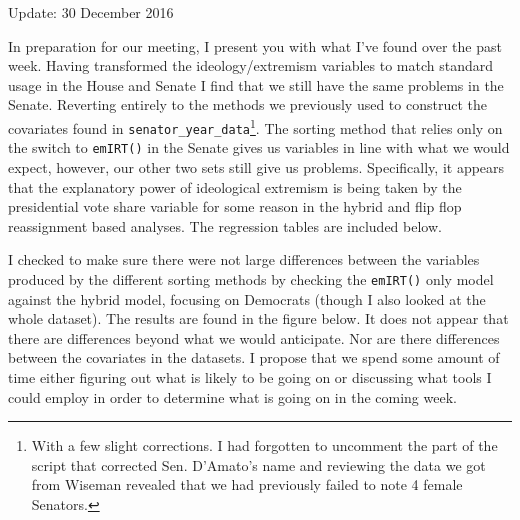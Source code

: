 \documentclass[12pt]{article}
\begin{document}
	
	\begin{center}
		Update: 30 December 2016
	\end{center}

In preparation for our meeting, I present you with what I've found over the past week. Having transformed the ideology/extremism variables to match standard usage in the House and Senate I find that we still have the same problems in the Senate. Reverting entirely to the methods we previously used to construct the covariates found in \verb|senator_year_data|\footnote{With a few slight corrections. I had forgotten to uncomment the part of the script that corrected Sen. D'Amato's name and reviewing the data we got from Wiseman revealed that we had previously failed to note 4 female Senators.}. The sorting method that relies only on the switch to \verb|emIRT()| in the Senate gives us variables in line with what we would expect, however, our other two sets still give us problems. Specifically, it appears that the explanatory power of ideological extremism is being taken by the presidential vote share variable for some reason in the hybrid and flip flop reassignment based analyses. The regression tables are included below.

I checked to make sure there were not large differences between the variables produced by the different sorting methods by checking the \verb|emIRT()| only model against the hybrid model, focusing on Democrats (though I also looked at the whole dataset). The results are found in the figure below. It does not appear that there are differences beyond what we would anticipate. Nor are there differences between the covariates in the datasets. I propose that we spend some amount of time either figuring out what is likely to be going on or discussing what tools I could employ in order to determine what is going on in the coming week.
\end{document}

